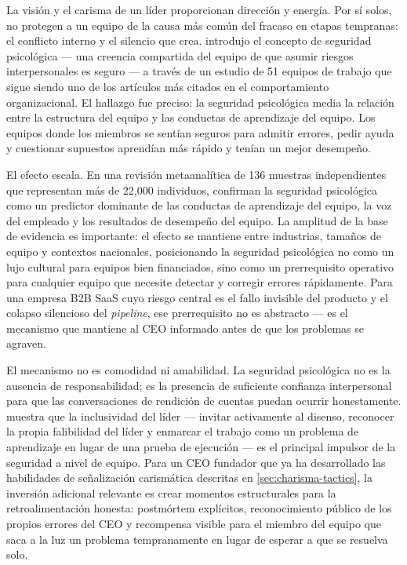 La visión y el carisma de un líder proporcionan dirección y energía. Por sí solos, no protegen a
un equipo de la causa más común del fracaso en etapas tempranas: el conflicto interno y el
silencio que crea. \textcite{edmondson1999psychological} introdujo el concepto de seguridad
psicológica --- una creencia compartida del equipo de que asumir riesgos interpersonales es seguro
--- a través de un estudio de 51 equipos de trabajo que sigue siendo uno de los artículos más
citados en el comportamiento organizacional. El hallazgo fue preciso: la seguridad psicológica
media la relación entre la estructura del equipo y las conductas de aprendizaje del equipo. Los
equipos donde los miembros se sentían seguros para admitir errores, pedir ayuda y cuestionar
supuestos aprendían más rápido y tenían un mejor desempeño.

El efecto escala. En una revisión metaanalítica de \num{136} muestras independientes que
representan más de
22,000 individuos, \textcite{frazier2017psychsafety} confirman la seguridad psicológica como un
predictor dominante de las conductas de aprendizaje del equipo, la voz del empleado y los
resultados de desempeño del equipo. La amplitud de la base de evidencia es importante: el efecto
se mantiene entre industrias, tamaños de equipo y contextos nacionales, posicionando la seguridad
psicológica no como un lujo cultural para equipos bien financiados, sino como un prerrequisito
operativo para cualquier equipo que necesite detectar y corregir errores rápidamente. Para una
empresa B2B SaaS cuyo riesgo central es el fallo invisible del producto y el colapso silencioso
del \emph{pipeline}, ese prerrequisito no es abstracto --- es el mecanismo que mantiene al CEO
informado antes de que los problemas se agraven.

El mecanismo no es comodidad ni amabilidad. La seguridad psicológica no es la ausencia de
responsabilidad; es la presencia de suficiente confianza interpersonal para que las conversaciones
de rendición de cuentas puedan ocurrir honestamente. \textcite{edmondson1999psychological} muestra
que la inclusividad del líder --- invitar activamente al disenso, reconocer la propia falibilidad
del líder y enmarcar el trabajo como un problema de aprendizaje en lugar de una prueba de
ejecución --- es el principal impulsor de la seguridad a nivel de equipo. Para un CEO fundador
que ya ha desarrollado las habilidades de señalización carismática descritas en
\cref{sec:charisma-tactics}, la inversión adicional relevante es crear momentos estructurales para
la retroalimentación honesta: postmórtem explícitos, reconocimiento público de los propios errores
del CEO y recompensa visible para el miembro del equipo que saca a la luz un problema
tempranamente en lugar de esperar a que se resuelva solo.

